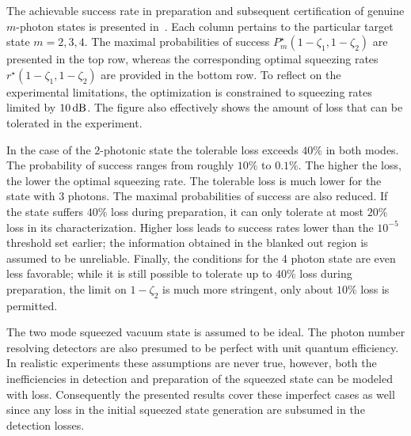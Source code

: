 \documentclass{article}
\begin{document}
The achievable success rate in preparation and subsequent certification of genuine $m$-photon states is presented in~. Each column pertains to the particular target state $m = 2, 3, 4$. The maximal probabilities of success $P_{m}^{\star} (1 - \zeta_{1}, 1 - \zeta_{2})$ are presented in the top row, whereas the corresponding optimal squeezing rates $r^{\star} (1 - \zeta_{1}, 1 - \zeta_{2})$ are provided in the bottom row.
To reflect on the experimental limitations, the optimization is constrained to squeezing rates limited by $10\,\mathrm{dB}$. The figure also effectively shows the amount of loss that can be tolerated in the experiment.

In the case of the $2$-photonic state the tolerable loss exceeds $40\%$ in both modes. The probability of success ranges from roughly $10\%$ to $0.1\%$. The higher the loss, the lower the optimal squeezing rate. The tolerable loss is much lower for the state with $3$ photons. The maximal probabilities of success are also reduced. If the state suffers $40\%$ loss during preparation, it can only tolerate at most $20\%$ loss in its characterization. Higher loss leads to success rates lower than the $10^{-5}$ threshold  set earlier; the information obtained in the blanked out region is assumed to be unreliable. Finally, the conditions for the 4 photon state are even less favorable; while it is still possible to tolerate up to $40\%$ loss during preparation, the limit on $1 - \zeta_{2}$ is much more stringent, only about $10\%$ loss is permitted.

The two mode squeezed vacuum state is assumed to be ideal. The photon number resolving detectors are also presumed to be perfect with unit quantum efficiency. In realistic experiments these assumptions are never true, however, both the inefficiencies in detection and preparation of the squeezed state can be modeled with loss. Consequently the presented results cover these imperfect cases as well since any loss in the initial squeezed state generation are subsumed in the detection losses.
\end{document}
